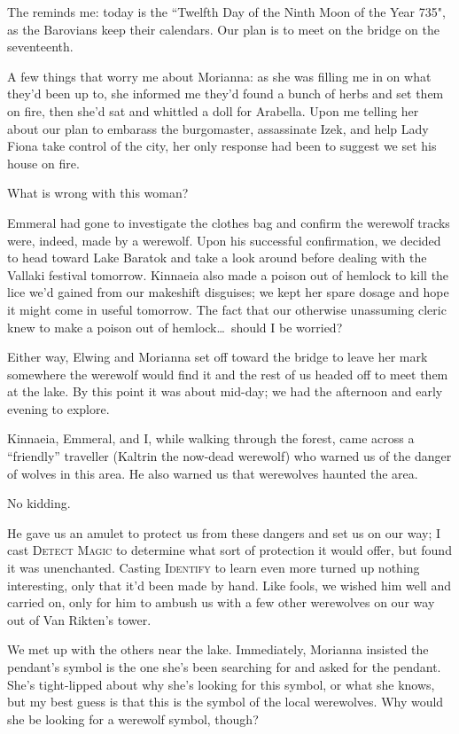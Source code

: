 The reminds me: today is the ``Twelfth Day of the Ninth Moon of the Year 735", as the Barovians keep their calendars. Our plan is to meet on the bridge on the seventeenth.

A few things that worry me about Morianna: as she was filling me in on what they'd been up to, she informed me they'd found a bunch of herbs and set them on fire, then she'd sat and whittled a doll for Arabella. Upon me telling her about our plan to embarass the burgomaster, assassinate Izek, and help Lady Fiona take control of the city, her only response had been to suggest we set his house on fire.

What is wrong with this woman?

Emmeral had gone to investigate the clothes bag and confirm the werewolf tracks were, indeed, made by a werewolf. Upon his successful confirmation, we decided to head toward Lake Baratok and take a look around before dealing with the Vallaki festival tomorrow. Kinnaeia also made a poison out of hemlock to kill the lice we'd gained from our makeshift disguises; we kept her spare dosage and hope it might come in useful tomorrow. The fact that our otherwise unassuming cleric knew to make a poison out of hemlock\dots\ should I be worried?

Either way, Elwing and Morianna set off toward the bridge to leave her mark somewhere the werewolf would find it and the rest of us headed off to meet them at the lake. By this point it was about mid-day; we had the afternoon and early evening to explore.

Kinnaeia, Emmeral, and I, while walking through the forest, came across a ``friendly'' traveller (Kaltrin the now-dead werewolf) who warned us of the danger of wolves in this area. He also warned us that werewolves haunted the area.

No kidding.

He gave us an amulet to protect us from these dangers and set us on our way; I cast \textsc{Detect Magic} to determine what sort of protection it would offer, but found it was unenchanted. Casting \textsc{Identify} to learn even more turned up nothing interesting, only that it'd been made by hand. Like fools, we wished him well and carried on, only for him to ambush us with a few other werewolves on our way out of Van Rikten's tower.

We met up with the others near the lake. Immediately, Morianna insisted the pendant's symbol is the one she's been searching for and asked for the pendant. She's tight-lipped about why she's looking for this symbol, or what she knows, but my best guess is that this is the symbol of the local werewolves. Why would she be looking for a werewolf symbol, though?

